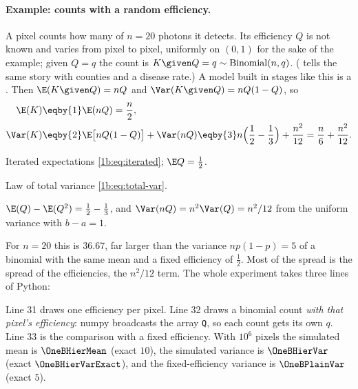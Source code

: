 \paragraph{Example: counts with a random efficiency.}
A pixel counts how many of $n=20$ photons it detects. Its efficiency $Q$ is
not known and varies from pixel to pixel, uniformly on $(0,1)$ for the sake of
the example; given $Q=q$ the count is $K\given Q=q\sim\mathrm{Binomial}(n,q)$.
( tells the same story with counties and a disease
rate.) A model built in stages like this is a .
Then $\E(K\given Q)=nQ$ and $\Var(K\given Q)=nQ(1-Q)$, so
\begin{align*}
  \E(K)&\eqby{1}\E(nQ)=\frac n2,\\
  \Var(K)&\eqby{2}\E\bigl[nQ(1-Q)\bigr]+\Var(nQ)
   \eqby{3} n\Bigl(\frac12-\frac13\Bigr)+\frac{n^2}{12}
   =\frac n6+\frac{n^2}{12}.
\end{align*}
\begin{explain}
  \item Iterated expectations \eqref{1b:eq:iterated}; $\E Q=\tfrac12$.
  \item Law of total variance \eqref{1b:eq:total-var}.
  \item $\E(Q)-\E(Q^2)=\tfrac12-\tfrac13$, and $\Var(nQ)=n^2\Var(Q)=n^2/12$
        from the uniform variance with $b-a=1$.
\end{explain}
For $n=20$ this is $36.67$, far larger than the variance $np(1-p)=5$ of a
binomial with the same mean and a fixed efficiency of $\tfrac12$. Most of the
spread is the spread of the efficiencies, the $n^2/12$ term. The whole
experiment takes three lines of Python:


Line 31 draws one efficiency per pixel. Line 32 draws a binomial count
\emph{with that pixel's efficiency}: numpy broadcasts the array \texttt{Q}, so
each count gets its own $q$. Line 33 is the comparison with a fixed
efficiency. With $10^6$ pixels the simulated mean is $\OneBHierMean$ (exact
$10$), the simulated variance is $\OneBHierVar$ (exact $\OneBHierVarExact$),
and the fixed-efficiency variance is $\OneBPlainVar$ (exact $5$).

